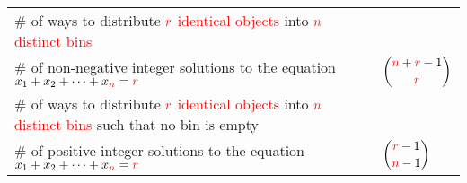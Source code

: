 \documentclass[12pt,addpoints,answers]{exam}
\begin{document}
\begin{questions}
\begin{center}
\begin{tabular}{|p{}|M{0.2\textwidth}|}
\# of ways to distribute ${{\mathcolor{red}r}}$ \textcolor{red}{identical objects} into ${{\mathcolor{red}n}}$ \textcolor{red}{distinct bins}  &  \\
\# of non-negative integer solutions to the equation $x_1+x_2+\cdots+x_{{\mathcolor{red}n}} = {{\mathcolor{red}r}}$ & \\
\hline
\# of ways to distribute ${{\mathcolor{red}r}}$ \textcolor{red}{identical objects} into ${{\mathcolor{red}n}}$ \textcolor{red}{distinct bins} such that no bin is empty &\\
\# of positive integer solutions to the equation $x_1+x_2+\cdots+x_{{\mathcolor{red}n}} = {{\mathcolor{red}r}}$ &  \\
\hline
\end {tabular}
\end{center}
\end{questions}
\label{totalpag}
\end{document}
